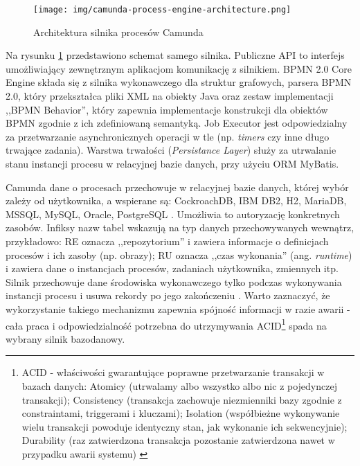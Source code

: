 \documentclass[declaration,shortabstract,mgr]{iithesis}
\begin{document}
\begin{figure}
    \texttt{[image: img/camunda-process-engine-architecture.png]}
    \caption{Architektura silnika procesów Camunda \cite{camunda-process-engine-architecture}}
    \label{fig:camunda-process-engine-architecture}
\end{figure}

Na rysunku \ref{fig:camunda-process-engine-architecture} przedstawiono schemat samego silnika. Publiczne API to interfejs umożliwiający zewnętrznym aplikacjom komunikację z silnikiem. BPMN 2.0 Core Engine składa się z silnika wykonawczego dla struktur grafowych, parsera BPMN 2.0, który przekształca pliki XML na obiekty Java oraz zestaw implementacji ,,BPMN Behavior'', który zapewnia implementacje konstrukcji dla obiektów BPMN zgodnie z ich zdefiniowaną semantyką. Job Executor jest odpowiedzialny za przetwarzanie asynchronicznych operacji w tle (np. \textit{timers} czy inne długo trwające zadania). Warstwa trwałości (\emph{Persistance Layer}) służy za utrwalanie stanu instancji procesu w relacyjnej bazie danych, przy użyciu ORM MyBatis.

Camunda dane o procesach przechowuje w relacyjnej bazie danych, której wybór zależy od użytkownika, a wspierane są: CockroachDB, IBM DB2, H2, MariaDB, MSSQL, MySQL, Oracle, PostgreSQL \cite{camunda-docs-supported-db}. Umożliwia to autoryzację konkretnych zasobów. Infiksy nazw tabel wskazują na typ danych przechowywanych wewnątrz, przykładowo: RE oznacza ,,repozytorium'' i zawiera informacje o definicjach procesów i ich zasoby (np. obrazy); RU oznacza ,,czas wykonania'' (ang. \textit{runtime}) i zawiera dane o instancjach procesów, zadaniach użytkownika, zmiennych itp. Silnik przechowuje dane środowiska wykonawczego tylko podczas wykonywania instancji procesu i usuwa rekordy po jego zakończeniu \cite{camunda-docs-db}. Warto zaznaczyć, że wykorzystanie takiego mechanizmu zapewnia spójność informacji w razie awarii - cała praca i odpowiedzialność potrzebna do utrzymywania ACID\footnote{ACID - właściwości gwarantujące poprawne przetwarzanie transakcji w bazach danych: Atomicy (utrwalamy albo wszystko albo nic z pojedynczej transakcji); Consistency (transakcja zachowuje niezmienniki bazy zgodnie z constraintami, triggerami i kluczami); Isolation (współbieżne wykonywanie wielu transakcji powoduje identyczny stan, jak wykonanie ich sekwencyjnie); Durability (raz zatwierdzona transakcja pozostanie zatwierdzona nawet w przypadku awarii systemu) \cite{wiki-acid}} spada na wybrany silnik bazodanowy.
\end{document}
